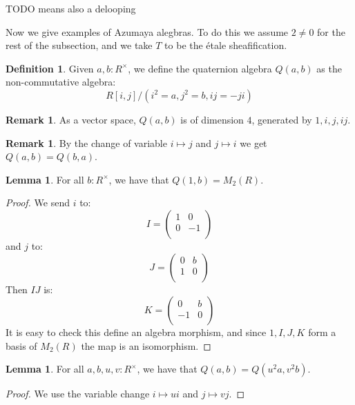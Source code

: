 \documentclass[10pt,a4paper]{article}
\theoremstyle{definition}
\newtheorem{lemma}[theorem]{Lemma}
\newtheorem{definition}[theorem]{Definition}
\newtheorem{remark}[theorem]{Remark}
\begin{document}
TODO means also a delooping

Now we give examples of Azumaya alegbras. To do this we assume $2\not=0$ for the rest of the subsection, and we take $T$ to be the étale sheafification.

\begin{definition}
Given $a,b:R^\times$, we define the quaternion algebra $Q(a,b)$ as the non-commutative algebra:
\[R[i,j]/(i^2=a,j^2=b,ij=-ji)\] 
\end{definition}

\begin{remark}
As a vector space, $Q(a,b)$ is of dimension $4$, generated by $1,i,j,ij$.
\end{remark}

\begin{remark}
By the change of variable $i\mapsto j$ and $j\mapsto i$ we get $Q(a,b) = Q(b,a)$.
\end{remark}

\begin{lemma}\label{quaternion-split}
For all $b:R^\times$, we have that $Q(1,b) = M_2(R)$.
\end{lemma}

\begin{proof}
We send $i$ to:
\[I = \begin{pmatrix}
1 & 0\\
0 & -1\\
\end{pmatrix}\]
and $j$ to:
\[J = \begin{pmatrix}
0 & b\\
1 & 0\\
\end{pmatrix}\]
Then $IJ$ is:
\[K = \begin{pmatrix}
0 & b\\
-1 & 0\\
\end{pmatrix}\]
It is easy to check this define an algebra morphism, and since $1,I,J,K$ form a basis of $M_2(R)$ the map is an isomorphism.
\end{proof}

\begin{lemma}\label{quaternion-change-variable}
For all $a,b,u,v:R^\times$, we have that $Q(a,b) = Q(u^2a,v^2b)$.
\end{lemma}

\begin{proof}
We use the variable change $i\mapsto ui$ and $j\mapsto vj$.
\end{proof}
\end{document}
